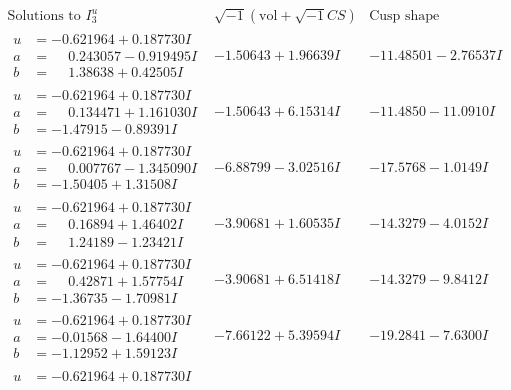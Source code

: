 \documentclass[1p]{elsarticle_modified}
\theoremstyle{definition}
\newcommand{\I}{\sqrt{-1}}
\begin{document}
$$\begin{array}{c|c|c}  
\text{Solutions to }I^u_{3}& \I (\text{vol} + \sqrt{-1}CS) & \text{Cusp shape}\\
 \hline 
\begin{aligned}
u &= -0.621964 + 0.187730 I \\
a &= \phantom{-}0.243057 - 0.919495 I \\
b &= \phantom{-}1.38638 + 0.42505 I\end{aligned}
 & -1.50643 + 1.96639 I & -11.48501 - 2.76537 I \\ \hline\begin{aligned}
u &= -0.621964 + 0.187730 I \\
a &= \phantom{-}0.134471 + 1.161030 I \\
b &= -1.47915 - 0.89391 I\end{aligned}
 & -1.50643 + 6.15314 I & -11.4850 - 11.0910 I \\ \hline\begin{aligned}
u &= -0.621964 + 0.187730 I \\
a &= \phantom{-}0.007767 - 1.345090 I \\
b &= -1.50405 + 1.31508 I\end{aligned}
 & -6.88799 - 3.02516 I & -17.5768 - 1.0149 I \\ \hline\begin{aligned}
u &= -0.621964 + 0.187730 I \\
a &= \phantom{-}0.16894 + 1.46402 I \\
b &= \phantom{-}1.24189 - 1.23421 I\end{aligned}
 & -3.90681 + 1.60535 I & -14.3279 - 4.0152 I \\ \hline\begin{aligned}
u &= -0.621964 + 0.187730 I \\
a &= \phantom{-}0.42871 + 1.57754 I \\
b &= -1.36735 - 1.70981 I\end{aligned}
 & -3.90681 + 6.51418 I & -14.3279 - 9.8412 I \\ \hline\begin{aligned}
u &= -0.621964 + 0.187730 I \\
a &= -0.01568 - 1.64400 I \\
b &= -1.12952 + 1.59123 I\end{aligned}
 & -7.66122 + 5.39594 I & -19.2841 - 7.6300 I \\ \hline\begin{aligned}
u &= -0.621964 + 0.187730 I \\

\end{aligned}
\end{array}$$
\end{document}
